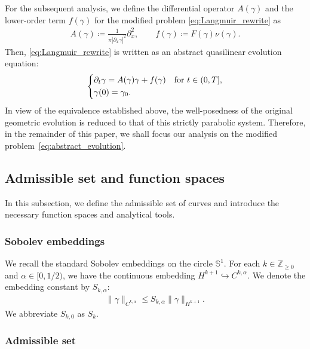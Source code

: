\documentclass{article}
\theoremstyle{remark}
\theoremstyle{definition}
\numberwithin{equation}{section}
\begin{document}
For the subsequent analysis, we define the differential operator $A(\gamma)$ and the lower-order term $f(\gamma)$ for the modified problem \eqref{eq:Langmuir_rewrite} as
\begin{align*}
    A(\gamma) \coloneqq \frac{1}{\pi |\partial_x\gamma|^2} \partial_x^2, \qquad
    f(\gamma) \coloneqq F(\gamma)\nu(\gamma).
\end{align*}
Then, \eqref{eq:Langmuir_rewrite} is written as an abstract quasilinear evolution equation:
\begin{equation}
    \begin{dcases*}
        \partial_t \gamma = A(\gamma)\gamma + f(\gamma) & for $t\in(0,T]$,\\
        \gamma(0) = \gamma_0.
    \end{dcases*}
    \label{eq:abstract_evolution}
\end{equation}
In view of the equivalence established above, the well-posedness of the original geometric evolution is reduced to that of this strictly parabolic system. Therefore, in the remainder of this paper, we shall focus our analysis on the modified problem~\eqref{eq:abstract_evolution}.




\subsection{Admissible set and function spaces}

In this subsection, we define the admissible set of curves and introduce the necessary function spaces and analytical tools.

\subsubsection{Sobolev embeddings}

We recall the standard Sobolev embeddings on the circle $\mathbb{S}^1$. For each $k \in \mathbb{Z}_{\ge 0}$ and $\alpha \in [0, 1/2)$, we have the continuous embedding $H^{k+1} \hookrightarrow C^{k,\alpha}$.
We denote the embedding constant by $S_{k,\alpha}$:
\begin{align}
    \|\gamma\|_{C^{k,\alpha}} \le S_{k,\alpha} \|\gamma\|_{H^{k+1}}.
    \label{eq:Sobolev}
\end{align}
We abbreviate $S_{k,0}$ as $S_k$.

\subsubsection{Admissible set}
\end{document}
